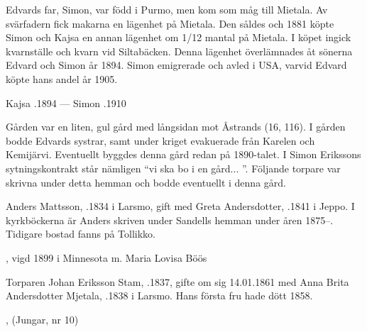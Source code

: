 Edvards far, Simon, var född i Purmo, men kom som måg till Mietala. Av svärfadern fick makarna en lägenhet på Mietala. Den såldes och 1881 köpte Simon och Kajsa en annan lägenhet om 1/12 mantal på Mietala. I köpet ingick kvarnställe och kvarn vid Siltabäcken. Denna lägenhet överlämnades åt sönerna Edvard och Simon år 1894. Simon emigrerade och avled i USA, varvid Edvard köpte hans andel år 1905.

Kajsa .1894  ---	Simon .1910


%

Gården var en liten, gul gård med långsidan mot Åstrands (16, 116).	I gården bodde Edvards systrar, samt under kriget evakuerade från Karelen och Kemijärvi. Eventuellt byggdes denna gård redan på 1890-talet. I Simon Erikssons sytningskontrakt står nämligen ``vi ska bo i en gård... ''. Följande torpare var skrivna under detta hemman och bodde eventuellt i denna gård.


%
Anders Mattsson, .1834 i Larsmo, gift med Greta Andersdotter, .1841 i Jeppo. I kyrkböckerna är Anders skriven under Sandells hemman under åren 1875--. Tidigare bostad fanns på Tollikko.
\begin{jhchildren}
  \item {}, vigd 1899 i  Minnesota m. Maria Lovisa Böös
  \item {}
\end{jhchildren}


%
Torparen Johan Eriksson Stam, .1837, gifte om sig 14.01.1861 med Anna Brita Andersdotter Mjetala, .1838 i Larsmo. Hans första fru hade dött 1858.
\begin{jhchildren}
  \item {}
  \item {}
  \item {}, (Jungar, nr 10)
  \item {}
\end{jhchildren}


